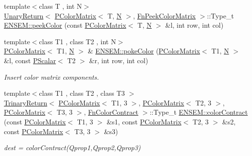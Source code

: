 \begin{DoxyCompactItemize}
\item 
{\footnotesize template$<$class T , int N$>$ }\\\mbox{\hyperlink{structENSEM_1_1UnaryReturn}{Unary\+Return}}$<$ \mbox{\hyperlink{classENSEM_1_1PColorMatrix}{P\+Color\+Matrix}}$<$ T, \mbox{\hyperlink{operator__name__util_8cc_a7722c8ecbb62d99aee7ce68b1752f337}{N}} $>$, \mbox{\hyperlink{structENSEM_1_1FnPeekColorMatrix}{Fn\+Peek\+Color\+Matrix}} $>$\+::Type\+\_\+t \mbox{\hyperlink{group__primcolormatrix_ga44a6b0393ecffb0c4aecc93b45a8d12d}{E\+N\+S\+E\+M\+::peek\+Color}} (const \mbox{\hyperlink{classENSEM_1_1PColorMatrix}{P\+Color\+Matrix}}$<$ T, \mbox{\hyperlink{operator__name__util_8cc_a7722c8ecbb62d99aee7ce68b1752f337}{N}} $>$ \&l, int row, int col)
\item 
{\footnotesize template$<$class T1 , class T2 , int N$>$ }\\\mbox{\hyperlink{classENSEM_1_1PColorMatrix}{P\+Color\+Matrix}}$<$ T1, \mbox{\hyperlink{operator__name__util_8cc_a7722c8ecbb62d99aee7ce68b1752f337}{N}} $>$ \& \mbox{\hyperlink{group__primcolormatrix_ga83e068e757a42e9866992b38a003d7f9}{E\+N\+S\+E\+M\+::poke\+Color}} (\mbox{\hyperlink{classENSEM_1_1PColorMatrix}{P\+Color\+Matrix}}$<$ T1, \mbox{\hyperlink{operator__name__util_8cc_a7722c8ecbb62d99aee7ce68b1752f337}{N}} $>$ \&l, const \mbox{\hyperlink{classENSEM_1_1PScalar}{P\+Scalar}}$<$ T2 $>$ \&r, int row, int col)
\begin{DoxyCompactList}\small\item\em Insert color matrix components. \end{DoxyCompactList}\item 
{\footnotesize template$<$class T1 , class T2 , class T3 $>$ }\\\mbox{\hyperlink{structENSEM_1_1TrinaryReturn}{Trinary\+Return}}$<$ \mbox{\hyperlink{classENSEM_1_1PColorMatrix}{P\+Color\+Matrix}}$<$ T1, 3 $>$, \mbox{\hyperlink{classENSEM_1_1PColorMatrix}{P\+Color\+Matrix}}$<$ T2, 3 $>$, \mbox{\hyperlink{classENSEM_1_1PColorMatrix}{P\+Color\+Matrix}}$<$ T3, 3 $>$, \mbox{\hyperlink{structENSEM_1_1FnColorContract}{Fn\+Color\+Contract}} $>$\+::Type\+\_\+t \mbox{\hyperlink{group__primcolormatrix_ga200705dac956b2d421ea1793fdb916b9}{E\+N\+S\+E\+M\+::color\+Contract}} (const \mbox{\hyperlink{classENSEM_1_1PColorMatrix}{P\+Color\+Matrix}}$<$ T1, 3 $>$ \&s1, const \mbox{\hyperlink{classENSEM_1_1PColorMatrix}{P\+Color\+Matrix}}$<$ T2, 3 $>$ \&s2, const \mbox{\hyperlink{classENSEM_1_1PColorMatrix}{P\+Color\+Matrix}}$<$ T3, 3 $>$ \&s3)
\begin{DoxyCompactList}\small\item\em dest = color\+Contract(\+Qprop1,\+Qprop2,\+Qprop3) \end{DoxyCompactList}\item 

\end{DoxyCompactItemize}
